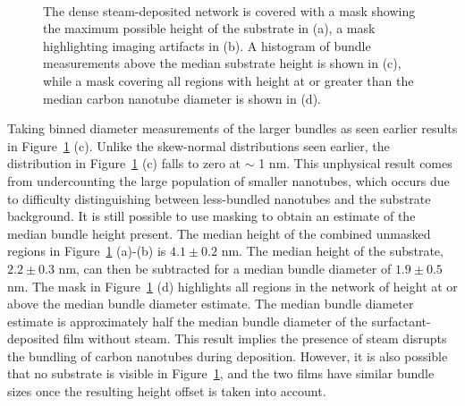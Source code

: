 \documentclass[
  letterpaper,
  DIV=11,
  numbers=noendperiod]{scrartcl}
\begin{document}
\begin{figure}
\begin{minipage}[t]{0.01\linewidth}
{\centering 

~

}

\end{minipage}%

\caption{\label{fig-dense-network}The dense steam-deposited network is
covered with a mask showing the maximum possible height of the substrate
in (a), a mask highlighting imaging artifacts in (b). A histogram of
bundle measurements above the median substrate height is shown in (c),
while a mask covering all regions with height at or greater than the
median carbon nanotube diameter is shown in (d).}

\end{figure}

Taking binned diameter measurements of the larger bundles as seen
earlier results in Figure~\ref{fig-dense-network} (c). Unlike the
skew-normal distributions seen earlier, the distribution in
Figure~\ref{fig-dense-network} (c) falls to zero at \(\sim\) 1 nm. This
unphysical result comes from undercounting the large population of
smaller nanotubes, which occurs due to difficulty distinguishing between
less-bundled nanotubes and the substrate background. It is still
possible to use masking to obtain an estimate of the median bundle
height present. The median height of the combined unmasked regions in
Figure~\ref{fig-dense-network} (a)-(b) is \(4.1 \pm 0.2\) nm. The median
height of the substrate, \(2.2 \pm 0.3\) nm, can then be subtracted for
a median bundle diameter of \(1.9 \pm 0.5\) nm. The mask in
Figure~\ref{fig-dense-network} (d) highlights all regions in the network
of height at or above the median bundle diameter estimate. The median
bundle diameter estimate is approximately half the median bundle
diameter of the surfactant-deposited film without steam. This result
implies the presence of steam disrupts the bundling of carbon nanotubes
during deposition. However, it is also possible that no substrate is
visible in Figure~\ref{fig-dense-network}, and the two films have
similar bundle sizes once the resulting height offset is taken into
account.
\end{document}
